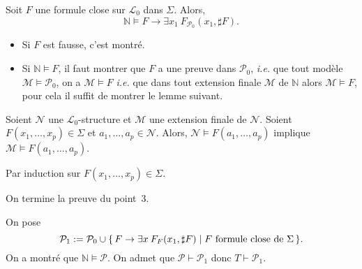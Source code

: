 \documentclass[./main]{subfiles}
\begin{document}
 \begin{prop}
   Soit $F$ une formule close sur $\mathcal{L}_0$ dans $\Sigma$.
   Alors, \[
     \mathds{N}\models F \to \exists x_1 \: F_{\mathcal{P}_0}(x_1, \sharp F)
   .\] 
 \end{prop}
 \begin{prv}
   \begin{itemize}
     \item Si $F$ est fausse, c'est montré.
     \item Si $\mathds{N} \models F$, il faut montrer que $F$ a une preuve dans $\mathcal{P}_0$, \textit{i.e.} que tout modèle $\mathcal{M} \models \mathcal{P}_0$, on a $\mathcal{M} \models F$ \textit{i.e.} que dans tout extension finale $\mathcal{M}$ de $\mathds{N}$ alors $\mathcal{M} \models F$, pour cela il suffit de montrer le lemme suivant.
   \end{itemize}
 \end{prv}

 \begin{lem}
   Soient $\mathcal{N}$ une $\mathcal{L}_0$-structure et $\mathcal{M}$ une extension finale de $\mathcal{N}$.
   Soient $F(x_1, \ldots, x_p) \in \Sigma$ et $a_1, \ldots, a_p \in \mathcal{N}$.
   Alors, $\mathcal{N} \models F(a_1, \ldots, a_p)$ implique $\mathcal{M} \models F(a_1, \ldots, a_p)$.
 \end{lem}
 \begin{prv}
   Par induction sur $F(x_1, \ldots, x_p) \in \Sigma$.
 \end{prv}

 On termine la preuve du point~3.
 \begin{prv}
   On pose \[
   \mathcal{P}_1 := \mathcal{P}_0 \cup \mleft\{\,F \to \exists x \: F_F(x_1, \sharp F) \;\middle|\; F \text{ formule close de } \Sigma\,\mright\}
   .\]
   On a montré que $\mathds{N} \models \mathcal{P}$.
   On admet que $\mathcal{P} \vdash \mathcal{P}_1$ donc $T \vdash \mathcal{P}_1$.
 \end{prv}
\end{document}
